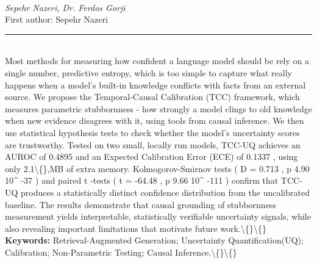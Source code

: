 \documentclass[10pt,twoside]{article}
\begin{document}
\noindent\begin{minipage}[t][\textheight]{\textwidth}
\\[0.35em]
{\itshape Sepehr Nazeri, Dr. Ferdos Gorji}\\[0.2em]
{\footnotesize First author: Sepehr Nazeri}\\[0.45em]
\noindent\rule{\textwidth}{0.3pt}\\[0.4em]
{\footnotesize  Most methods for measuring how confident a language model should be rely on a single number, predictive entropy, which is too simple to capture what really happens when a model's built-in knowledge conflicts with facts from an external source. We propose the Temporal-Causal Calibration (TCC) framework, which measures parametric stubbornness - how strongly a model clings to old knowledge when new evidence disagrees with it, using tools from causal inference. We then use statistical hypothesis tests to check whether the model's uncertainty scores are trustworthy. Tested on two small, locally run models, TCC-UQ achieves an AUROC of 0.4895 and an Expected Calibration Error (ECE) of 0.1337 , using only 2.1\textbackslash\{\},MB of extra memory. Kolmogorov-Smirnov tests ( D = 0.713 , p 4.90 10\textasciicircum{} -37 ) and paired t -tests ( t = -64.48 , p 9.66 10\textasciicircum{} -111 ) confirm that TCC-UQ produces a statistically distinct confidence distribution from the uncalibrated baseline. The results demonstrate that causal grounding of stubbornness measurement yields interpretable, statistically verifiable uncertainty signals, while also revealing important limitations that motivate future work.\textbackslash\{\}\textbackslash\{\}}\\[0.4em]
{\footnotesize\bfseries Keywords:} {\footnotesize Retrieval-Augmented Generation; Uncertainty Quantification(UQ); Calibration; Non-Parametric Testing; Causal Inference.\textbackslash\{\}\textbackslash\{\}}\\[0.15em]
\vfill
\end{minipage}
\newpage
\end{document}
